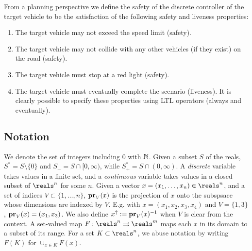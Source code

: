 From a planning perspective we define the safety of the discrete controller of the target vehicle to be the satisfaction of the following safety and liveness properties:
\begin{enumerate}
	\item The target vehicle may not exceed the speed limit (safety).
	\item The target vehicle may not collide with any other vehicles (if they exist) on the road (safety).
	\item The target vehicle must stop at a red light (safety).
	\item The target vehicle must eventually complete the scenario (liveness).
It is clearly possible to specify these properties using LTL operators (always and eventually).
\end{enumerate}

%
%
%
%
%

\subsection{Notation}
We denote the set of integers including 0 with $\Ne$. 
Given a subset $S$ of the reals, $S^* = S \setminus \{0\}$ and $S_+ = S \cap [0,\infty)$,
while $S_+^* = S \cap (0,\infty)$.
A \emph{discrete} variable takes values in a finite set, and a \emph{continuous} variable takes values in a closed subset of $\reals^n$ for some $n$.
Given a vector $x = (x_1,\ldots,x_n) \in \reals^n$, and a set of indices $V \subset \{1,\ldots,n\}$, $\proj{x}{V}$ is the projection of $x$ onto the subspsace whose dimensions are indexed by $V$. 
E.g. with $x = (x_1,x_2,x_3,x_4)$ and $V=\{1,3\}$, $\proj{x}{V} = (x_1,x_3)$.
We also define $x^\uparrow \defeq \proj{x}{V}^{-1}$ when $V$ is clear from the context.
A set-valued map $F: \reals^n \rightrightarrows \reals^m$ maps each $x$ in its domain to a subset of its range.
For a set $K \subset \reals^n$, we abuse notation by writing $F(K)$ for $\cup_{x\in K}F(x)$.